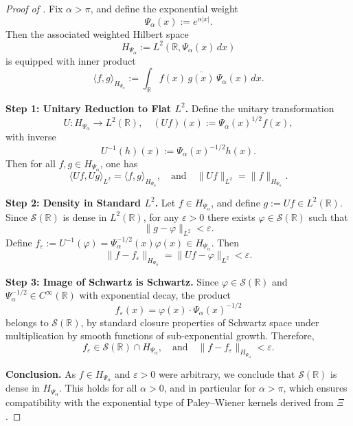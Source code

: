 \begin{proof}[Proof of ]
Fix \( \alpha > \pi \), and define the exponential weight
\[
\Psi_\alpha(x) := e^{\alpha |x|}.
\]
Then the associated weighted Hilbert space
\[
H_{\Psi_\alpha} := L^2(\mathbb{R}, \Psi_\alpha(x)\,dx)
\]
is equipped with inner product
\[
\langle f, g \rangle_{H_{\Psi_\alpha}} := \int_{\mathbb{R}} f(x)\, \overline{g(x)}\, \Psi_\alpha(x)\, dx.
\]

\medskip
\noindent\textbf{Step 1: Unitary Reduction to Flat \( L^2 \).}
Define the unitary transformation
\[
U \colon H_{\Psi_\alpha} \to L^2(\mathbb{R}), \quad (Uf)(x) := \Psi_\alpha(x)^{1/2} f(x),
\]
with inverse
\[
U^{-1}(h)(x) := \Psi_\alpha(x)^{-1/2} h(x).
\]
Then for all \( f, g \in H_{\Psi_\alpha} \), one has
\[
\langle Uf, Ug \rangle_{L^2} = \langle f, g \rangle_{H_{\Psi_\alpha}}, \quad \text{and} \quad \|Uf\|_{L^2} = \|f\|_{H_{\Psi_\alpha}}.
\]

\medskip
\noindent\textbf{Step 2: Density in Standard \( L^2 \).}
Let \( f \in H_{\Psi_\alpha} \), and define \( g := Uf \in L^2(\mathbb{R}) \). Since \( \mathcal{S}(\mathbb{R}) \) is dense in \( L^2(\mathbb{R}) \), for any \( \varepsilon > 0 \) there exists \( \varphi \in \mathcal{S}(\mathbb{R}) \) such that
\[
\|g - \varphi\|_{L^2} < \varepsilon.
\]
Define \( f_\varepsilon := U^{-1}(\varphi) = \Psi_\alpha^{-1/2}(x) \varphi(x) \in H_{\Psi_\alpha} \). Then
\[
\|f - f_\varepsilon\|_{H_{\Psi_\alpha}} = \|Uf - \varphi\|_{L^2} < \varepsilon.
\]

\medskip
\noindent\textbf{Step 3: Image of Schwartz is Schwartz.}
Since \( \varphi \in \mathcal{S}(\mathbb{R}) \) and \( \Psi_\alpha^{-1/2} \in C^\infty(\mathbb{R}) \) with exponential decay, the product
\[
f_\varepsilon(x) = \varphi(x) \cdot \Psi_\alpha(x)^{-1/2}
\]
belongs to \( \mathcal{S}(\mathbb{R}) \), by standard closure properties of Schwartz space under multiplication by smooth functions of sub-exponential growth. Therefore,
\[
f_\varepsilon \in \mathcal{S}(\mathbb{R}) \cap H_{\Psi_\alpha}, \quad \text{and} \quad \|f - f_\varepsilon\|_{H_{\Psi_\alpha}} < \varepsilon.
\]

\medskip
\noindent\textbf{Conclusion.}
As \( f \in H_{\Psi_\alpha} \) and \( \varepsilon > 0 \) were arbitrary, we conclude that \( \mathcal{S}(\mathbb{R}) \) is dense in \( H_{\Psi_\alpha} \). This holds for all \( \alpha > 0 \), and in particular for \( \alpha > \pi \), which ensures compatibility with the exponential type of Paley–Wiener kernels derived from \( \Xi \).


\end{proof}
